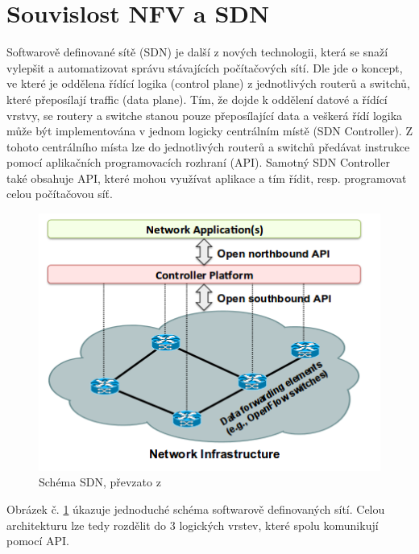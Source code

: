 \section{Souvislost NFV a SDN} \label{sub:SDN}

Softwarově definované sítě (SDN) je další z nových technologii, která se snaží vylepšit a automatizovat správu stávajících počítačových sítí. Dle \cite{SDN_clanek} jde o koncept, ve které je oddělena řídící logika (control plane) z jednotlivých routerů a switchů, které přeposílají traffic (data plane). Tím, že dojde k oddělení datové a řídící vrstvy, se routery a switche stanou pouze přeposílající data a veškerá řídí logika může být implementována v jednom logicky centrálním místě (SDN Controller). Z tohoto centrálního místa lze do jednotlivých routerů a switchů předávat instrukce pomocí aplikačních programovacích rozhraní (API). Samotný SDN Controller také obsahuje API, které mohou využívat aplikace a tím řídit, resp. programovat celou počítačovou síť.

\begin{figure}[h]
\begin{centering}
\includegraphics[scale=0.60]{images/SDN}
\par\end{centering}
\caption{Schéma SDN, převzato z \cite{SDN_clanek}\label{fig:SDN}}
\end{figure}

Obrázek č. \ref{fig:SDN} úkazuje jednoduché schéma softwarově definovaných sítí. Celou architekturu lze tedy rozdělit do 3 logických vrstev, které spolu komunikují pomocí API. 

